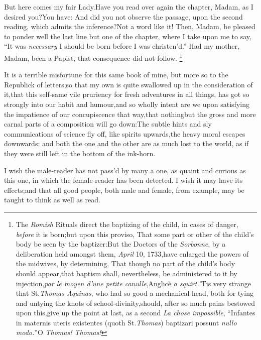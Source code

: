 \documentclass{article}
\begin{document}
\tsh  But here comes my fair Lady.\break Have you read over again the
chapter, Madam, as I desired you?\tsk  You have: And did you not observe the
passage, upon the second reading, which admits the inference?\tsk  Not a word
like it! Then, Madam, be pleased to ponder well the last line but one of the
chapter, where I take upon me to say, “It was \textit{necessary} I should
be born before I was christen’d.” Had my mother, Madam, been a
Papist, that consequence did not follow. \footnote{\enspace The \textit{Romish} Rituals direct
the baptizing of the child, in cases of danger, \textit{before} it is born;\tsk  but
upon this proviso, That some part or other of the child’s body be seen by the
baptizer:\tsh  But the Doctors of the \textit{Sorbonne}, by a deliberation held
amongst them, \textit{April} 10, 1733,\tsk  have enlarged the powers of the midwives,
by determining, That though no part of the child’s body should appear,\tsk  that
baptism shall, nevertheless, be administered to it by injection,\tsk  \textit{par le
moyen d’une petite canulle},\tsk  Anglicè \textit{a squirt.}\tsk  ’Tis very strange that
St.\@ \textit{Thomas Aquinas}, who had so good a mechanical head, both for tying and
untying the knots of school-divinity,\tsk  should, after so much pains bestowed upon
this,\tsk  give up the point at last, as a second \textit{La chose impossible},\tsk 
“Infantes in maternis uteris existentes (quoth St.\@  \textit{Thomas}) baptizari
possunt \textit{nullo modo.}”\tsk  O \textit{Thomas!  Thomas!}}


It is a terrible misfortune for this same book of mine, but more
so to the Republick of letters;\tsk  so that my own is quite
swallowed up in the consideration of it,\tsk  that this self-same
vile pruriency for fresh adventures in all things, has got so strongly into our habit and humour,\tsk  and so
wholly intent are we upon satisfying the impatience of our
concupiscence that way,\tsk  that nothing\pb but the gross and more
carnal parts of a composition will go down:\tsk  The subtle hints
and sly communications of science fly off, like spirits
upwards,\tsk  the heavy moral escapes downwards; and both the one
and the other are as much lost to the world, as if they were still
left in the bottom of the ink-horn.

I wish the male-reader has not pass’d by many a one, as
quaint and curious as this one, in which the female-reader has been
detected. I wish it may have its effects;\tsk  and that all good
people, both male and female, from example, may be taught to think
as well as read.
\end{document}

